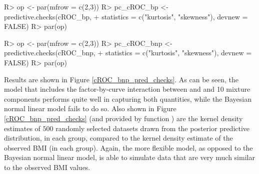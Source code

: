 \begin{example}
R> op <- par(mfrow = c(2,3))
R> pc_cROC_bp <- predictive.checks(cROC_bp, 
+ statistics = c("kurtosis", "skewness"), devnew = FALSE)
R> par(op)
		
R> op <- par(mfrow = c(2,3))
R> pc_cROC_bnp <- predictive.checks(cROC_bnp, 
+ statistics = c("kurtosis", "skewness"), devnew = FALSE)
R> par(op)
\end{example}
Results are shown in Figure \ref{cROC_bnp_pred_checks}. As can be seen, the model that includes the factor-by-curve interaction between  and  and 10 mixture components performs quite well in capturing both quantities, while the Bayesian normal linear model fails to do so. Also shown in Figure \ref{cROC_bnp_pred_checks} (and provided by function ) are the kernel density estimates of $500$ randomly selected datasets drawn from the posterior predictive distribution, in each group, compared to the kernel density estimate of the observed BMI (in each group). Again, the more flexible model, as opposed to the Bayesian normal linear model, is able to simulate data that are very much similar to the observed BMI values.
